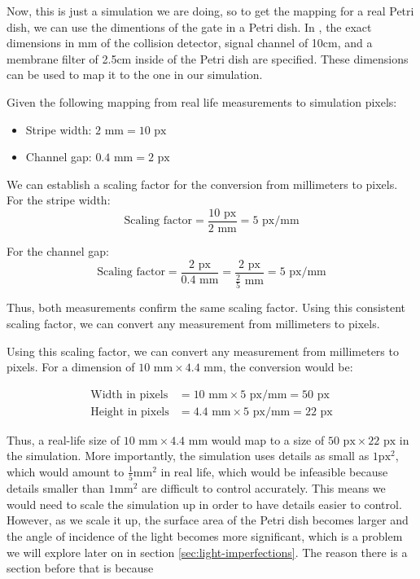Now, this is just a simulation we are doing, so to get the mapping for a real Petri dish, we can use the dimentions of the gate in a Petri dish. 
In \cite{gorecki2003chemical}, the exact dimensions in mm of the collision detector, signal channel of 10cm, and a membrane filter of 2.5cm inside of the Petri dish are specified. These dimensions can be used to map it to the one in our simulation.


Given the following mapping from real life measurements to simulation pixels:
\begin{itemize}
    \item Stripe width: \(2 \text{ mm} = 10 \text{ px}\)
    \item Channel gap: \(0.4 \text{ mm} = 2 \text{ px}\)
\end{itemize}

We can establish a scaling factor for the conversion from millimeters to pixels.
For the stripe width:
\[ \text{Scaling factor} = \frac{10 \text{ px}}{2 \text{ mm}} = 5 \text{ px/mm} \]

For the channel gap:
\[ \text{Scaling factor} = \frac{2 \text{ px}}{0.4 \text{ mm}} = \frac{2 \text{ px}}{\frac{2}{5} \text{ mm}} = 5 \text{ px/mm} \]

Thus, both measurements confirm the same scaling factor. Using this consistent scaling factor, we can convert any measurement from millimeters to pixels.

Using this scaling factor, we can convert any measurement from millimeters to pixels.
For a dimension of \(10 \text{ mm} \times 4.4 \text{ mm}\), the conversion would be:

\begin{align*}
\text{Width in pixels} &= 10 \text{ mm} \times 5 \text{ px/mm} = 50 \text{ px} \\
\text{Height in pixels} &= 4.4 \text{ mm} \times 5 \text{ px/mm} = 22 \text{ px}
\end{align*}

Thus, a real-life size of \(10 \text{ mm} \times 4.4 \text{ mm}\) would map to a size of \(50 \text{ px} \times 22 \text{ px}\) in the simulation.
More importantly, the simulation uses details as small as $1\text{px}^2$, which would amount to $\frac{1}{5}\text{mm}^2$ in real life, which would be infeasible because details smaller than $1\text{mm}^2$ are difficult to control accurately.
This means we would need to scale the simulation up in order to have details easier to control. 
However, as we scale it up, the surface area of the Petri dish becomes larger and the angle of incidence of the light becomes more significant, which is a problem we will explore later on in section \ref{sec:light-imperfections}.
The reason there is a section before that is because 


